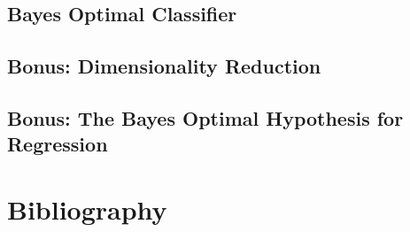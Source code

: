 \documentclass[12pt]{article}
\begin{document}
\section{Bayes Optimal Classifier}



\section{Bonus: Dimensionality Reduction}


\section{Bonus: The Bayes Optimal Hypothesis for Regression}


\chapter*{Bibliography}
%	



\end{document}
